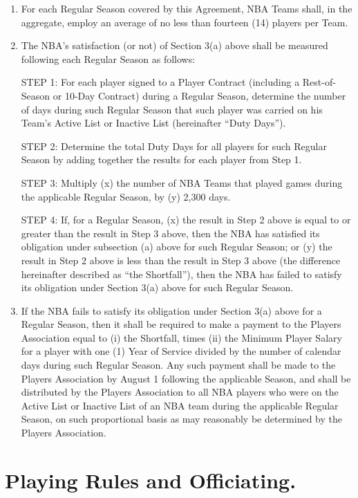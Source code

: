 \documentclass[
]{book}
\begin{document}
\begin{enumerate}
\def\labelenumi{(\alph{enumi})}
\item
  For each Regular Season covered by this Agreement, NBA Teams shall, in the aggregate, employ an average of no less than fourteen (14) players per Team.
\item
  The NBA's satisfaction (or not) of Section 3(a) above shall be measured following each Regular Season as follows:

  STEP 1: For each player signed to a Player Contract (including a Rest-of-Season or 10-Day Contract) during a Regular Season, determine the number of days during such Regular Season that such player was carried on his Team's Active List or Inactive List (hereinafter ``Duty Days'').

  STEP 2: Determine the total Duty Days for all players for such Regular Season by adding together the results for each player from Step 1.

  STEP 3: Multiply (x) the number of NBA Teams that played games during the applicable Regular Season, by (y) 2,300 days.

  STEP 4: If, for a Regular Season, (x) the result in Step 2 above is equal to or greater than the result in Step 3 above, then the NBA has satisfied its obligation under subsection (a) above for such Regular Season; or (y) the result in Step 2 above is less than the result in Step 3 above (the difference hereinafter described as ``the Shortfall''), then the NBA has failed to satisfy its obligation under Section 3(a) above for such Regular Season.
\item
  If the NBA fails to satisfy its obligation under Section 3(a) above for a Regular Season, then it shall be required to make a payment to the Players Association equal to (i) the Shortfall, times (ii) the Minimum Player Salary for a player with one (1) Year of Service divided by the number of calendar days during such Regular Season. Any such payment shall be made to the Players Association by August 1 following the applicable Season, and shall be distributed by the Players Association to all NBA players who were on the Active List or Inactive List of an NBA team during the applicable Regular Season, on such proportional basis as may reasonably be determined by the Players Association.
\end{enumerate}

\hypertarget{playing-rules-and-officiating.}{%
\section{Playing Rules and Officiating.}\label{playing-rules-and-officiating.}}
\end{document}
